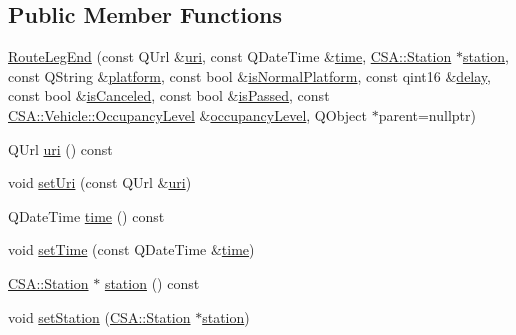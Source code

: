 \subsection*{Public Member Functions}
\begin{DoxyCompactItemize}
\item 
\mbox{\hyperlink{classCSA_1_1RouteLegEnd_a209849fda86c0e85e7c5b6b740471679}{Route\+Leg\+End}} (const Q\+Url \&\mbox{\hyperlink{classCSA_1_1RouteLegEnd_a6461241e58c65d43279afca09fd6be8a}{uri}}, const Q\+Date\+Time \&\mbox{\hyperlink{classCSA_1_1RouteLegEnd_af4543d06eb45cb23ef27d76f75a34ba7}{time}}, \mbox{\hyperlink{classCSA_1_1Station}{C\+S\+A\+::\+Station}} $\ast$\mbox{\hyperlink{classCSA_1_1RouteLegEnd_af8401206d340ff819ccc77dbc9b04c4b}{station}}, const Q\+String \&\mbox{\hyperlink{classCSA_1_1RouteLegEnd_a3ae0babc5849e36e2df61410da6a1cdd}{platform}}, const bool \&\mbox{\hyperlink{classCSA_1_1RouteLegEnd_a516ce67088e866a951fde382dba4e9e2}{is\+Normal\+Platform}}, const qint16 \&\mbox{\hyperlink{classCSA_1_1RouteLegEnd_ab1ea8c249d0a40884f446639ab030bc3}{delay}}, const bool \&\mbox{\hyperlink{classCSA_1_1RouteLegEnd_aca61ef191ba822aaed436707da242ef3}{is\+Canceled}}, const bool \&\mbox{\hyperlink{classCSA_1_1RouteLegEnd_a5359a35f5b132be17444fe8d1090671f}{is\+Passed}}, const \mbox{\hyperlink{classCSA_1_1Vehicle_a331cc81107e5f0a8f37f894729dd9bda}{C\+S\+A\+::\+Vehicle\+::\+Occupancy\+Level}} \&\mbox{\hyperlink{classCSA_1_1RouteLegEnd_aec102317dd7705a8b62b4ec8ee08597f}{occupancy\+Level}}, Q\+Object $\ast$parent=nullptr)
\item 
Q\+Url \mbox{\hyperlink{classCSA_1_1RouteLegEnd_a6461241e58c65d43279afca09fd6be8a}{uri}} () const
\item 
void \mbox{\hyperlink{classCSA_1_1RouteLegEnd_a7d5b3ff4ed0d733bc53db77fbf12a69c}{set\+Uri}} (const Q\+Url \&\mbox{\hyperlink{classCSA_1_1RouteLegEnd_a6461241e58c65d43279afca09fd6be8a}{uri}})
\item 
Q\+Date\+Time \mbox{\hyperlink{classCSA_1_1RouteLegEnd_af4543d06eb45cb23ef27d76f75a34ba7}{time}} () const
\item 
void \mbox{\hyperlink{classCSA_1_1RouteLegEnd_a20536e6606c877bc94f6093f8a0a4f1a}{set\+Time}} (const Q\+Date\+Time \&\mbox{\hyperlink{classCSA_1_1RouteLegEnd_af4543d06eb45cb23ef27d76f75a34ba7}{time}})
\item 
\mbox{\hyperlink{classCSA_1_1Station}{C\+S\+A\+::\+Station}} $\ast$ \mbox{\hyperlink{classCSA_1_1RouteLegEnd_af8401206d340ff819ccc77dbc9b04c4b}{station}} () const
\item 
void \mbox{\hyperlink{classCSA_1_1RouteLegEnd_aad038e9175944c0a0b494cb8413f1bbc}{set\+Station}} (\mbox{\hyperlink{classCSA_1_1Station}{C\+S\+A\+::\+Station}} $\ast$\mbox{\hyperlink{classCSA_1_1RouteLegEnd_af8401206d340ff819ccc77dbc9b04c4b}{station}})

\end{DoxyCompactItemize}
